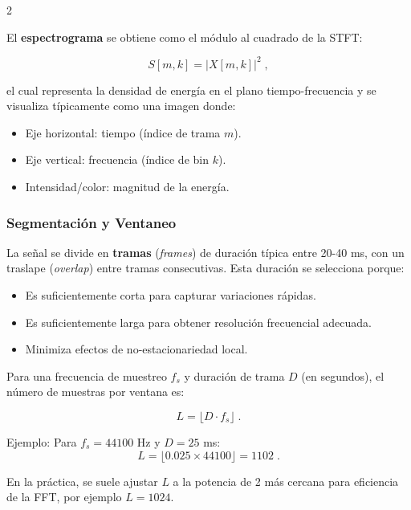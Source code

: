 \documentclass[12pt]{report}
\newenvironment{tightmulticols}{%
  \begin{multicols}{2}
  \setlength{\parskip}{1.2pt}
  \linespread{1}\selectfont
}{%
  \end{multicols}
}
\begin{document}
\begin{tightmulticols}
\noindent El \textbf{espectrograma} se obtiene como el módulo al cuadrado de la STFT:

\begin{equation}
    S[m, k] = |X[m, k]|^2 \; ,
\end{equation}

\noindent el cual representa la densidad de energía en el plano tiempo-frecuencia y se visualiza típicamente como una imagen donde:
\begin{itemize}
    \item Eje horizontal: tiempo (índice de trama $m$).
    \item Eje vertical: frecuencia (índice de bin $k$).
    \item Intensidad/color: magnitud de la energía.
\end{itemize}

\subsubsection{Segmentación y Ventaneo}

\noindent La señal se divide en \textbf{tramas} (\textit{frames}) de duración típica entre 20-40 ms, con un traslape (\textit{overlap}) entre tramas consecutivas. Esta duración se selecciona porque:

\begin{itemize}
    \item Es suficientemente corta para capturar variaciones rápidas.
    \item Es suficientemente larga para obtener resolución frecuencial adecuada.
    \item Minimiza efectos de no-estacionariedad local.
\end{itemize}

\noindent Para una frecuencia de muestreo $f_s$ y duración de trama $D$ (en segundos), el número de muestras por ventana es:

\begin{equation*}
    L = \lfloor D \cdot f_s \rfloor \; .
\end{equation*}

\noindent Ejemplo: Para $f_s = 44100$ Hz y $D = 25$ ms:
\begin{equation*}
    L = \lfloor 0.025 \times 44100 \rfloor = 1102 \; .
\end{equation*}

\noindent En la práctica, se suele ajustar $L$ a la potencia de 2 más cercana para eficiencia de la FFT, por ejemplo $L = 1024$.


\end{tightmulticols}
\end{document}
